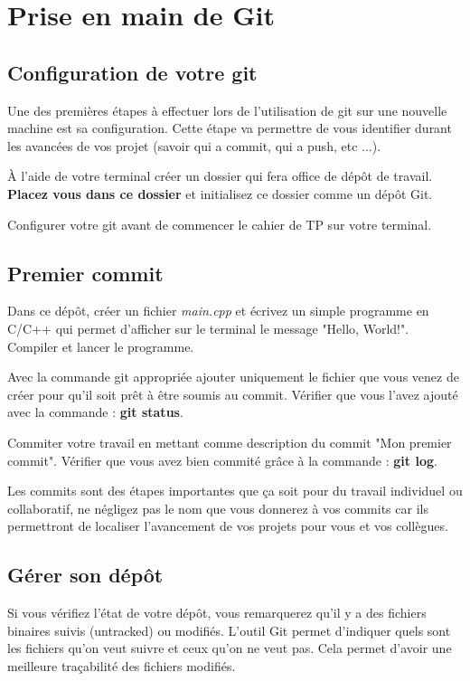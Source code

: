 \setcounter{page}{1}
\chapter{Prise en main de Git}
\label{label:prise_en_main_git}
\section{Configuration de votre git}

Une des premières étapes à effectuer lors de l'utilisation de git sur une nouvelle machine est sa configuration. Cette étape va permettre de vous identifier durant les avancées de vos projet (savoir qui a commit, qui a push, etc ...). 

\medskip

À l'aide de votre terminal créer un dossier qui fera office de dépôt de travail. \textbf{Placez vous dans ce dossier} et initialisez ce dossier comme un dépôt Git.

\medskip

Configurer votre git avant de commencer le cahier de TP sur votre terminal.


\section{Premier commit}

Dans ce dépôt, créer un fichier \textit{main.cpp} et écrivez un simple programme en C/C++ qui permet d'afficher sur le terminal le message "Hello, World!". Compiler et lancer le programme. 

\medskip

Avec la commande git appropriée ajouter uniquement le fichier que vous venez de créer pour qu'il soit prêt à être soumis au commit. Vérifier que vous l'avez ajouté avec la commande : \textbf{git status}.

\medskip

Commiter votre travail en mettant comme description du commit "Mon premier commit". Vérifier que vous avez bien commité grâce à la commande : \textbf{git log}. 

\medskip

Les commits sont des étapes importantes que ça soit pour du travail individuel ou collaboratif, ne négligez pas le nom que vous donnerez à vos commits car ils permettront de localiser l'avancement de vos projets pour vous et vos collègues.

\section{Gérer son dépôt}
Si vous vérifiez l'état de votre dépôt, vous remarquerez qu'il y a des fichiers binaires suivis (untracked) ou modifiés. L'outil Git permet d'indiquer quels sont les fichiers qu'on veut suivre et ceux qu'on ne veut pas. Cela permet d'avoir une meilleure traçabilité des fichiers modifiés.
\medskip

